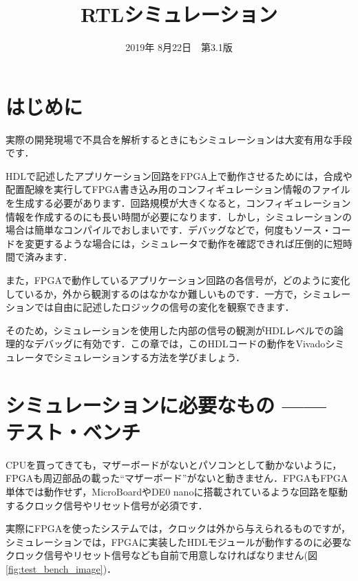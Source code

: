 \documentclass[a4paper,dvipdfmx]{jsarticle}
\begin{document}
\title{RTLシミュレーション}
\author{}
\date{2019年 8月22日~~第3.1版}
\maketitle

\section{はじめに}
実際の開発現場で不具合を解析するときにもシミュレーションは大変有用な手段です．

HDLで記述したアプリケーション回路をFPGA上で動作させるためには，合成や配置配線を実行してFPGA書き込み用のコンフィギュレーション情報のファイルを生成する必要があります．回路規模が大きくなると，コンフィギュレーション情報を作成するのにも長い時間が必要になります．しかし，シミュレーションの場合は簡単なコンパイルでおしまいです．デバッグなどで，何度もソース・コードを変更するような場合には，シミュレータで動作を確認できれば圧倒的に短時間で済みます．

また，FPGAで動作しているアプリケーション回路の各信号が，どのように変化しているか，外から観測するのはなかなか難しいものです．一方で，シミュレーションでは自由に記述したロジックの信号の変化を観察できます．

そのため，シミュレーションを使用した内部の信号の観測がHDLレベルでの論理的なデバッグに有効です．この章では，このHDLコードの動作をVivadoシミュレータでシミュレーションする方法を学びましょう．

\section{シミュレーションに必要なもの —— テスト・ベンチ}
CPUを買ってきても，マザーボードがないとパソコンとして動かないように，FPGAも周辺部品の載った``マザーボード''がないと動きません．FPGAもFPGA単体では動作せず，MicroBoardやDE0 nanoに搭載されているような回路を駆動するクロック信号やリセット信号が必須です．

実際にFPGAを使ったシステムでは，クロックは外から与えられるものですが，シミュレーションでは，FPGAに実装したHDLモジュールが動作するのに必要なクロック信号やリセット信号なども自前で用意しなければなりません(図\ref{fig:test_bench_image})．
\end{document}
